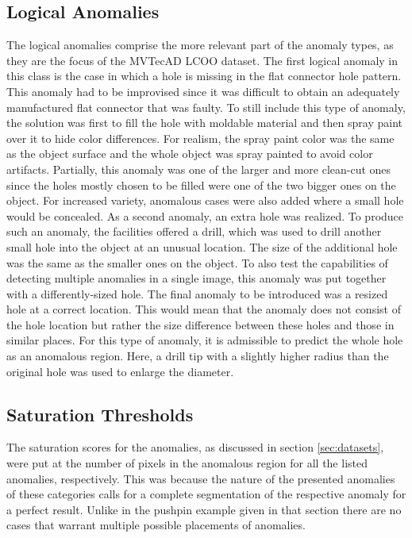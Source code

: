 \subsection{Logical Anomalies}
The logical anomalies comprise the more relevant part of the anomaly types, as they are the focus of the MVTecAD LCOO dataset. The first logical anomaly in this class is the case in which a hole 
is missing in the flat connector hole pattern. This anomaly had to be improvised since it was difficult to obtain an adequately manufactured flat connector that was faulty. To still include 
this type of anomaly, the solution was first to fill the hole with moldable material and then spray paint over it to hide color differences. For realism, the spray paint color was the same as the 
object surface and the whole object was spray painted to avoid color artifacts. Partially, this anomaly was one of the larger and more clean-cut ones since the holes mostly chosen to be filled were one of the two 
bigger ones on the object. For increased variety, anomalous cases were also added where a small hole would be concealed. As a second anomaly, an extra hole was realized. To produce such an anomaly, the facilities offered a drill, which was used to drill another small hole into 
the object at an unusual location. The size of the additional hole was the same as the smaller ones on the object. To also test the capabilities of detecting multiple anomalies in a single image, this anomaly 
was put together with a differently-sized hole. The final anomaly to be introduced was a resized hole at a correct 
location. This would mean that the anomaly does not consist of the hole location but rather the size difference between these holes and those in similar places. For this type of anomaly, it 
is admissible to predict the whole hole as an anomalous region.
Here, a drill tip with a slightly higher radius than the original hole was used to enlarge the diameter.


\subsection{Saturation Thresholds}

The saturation scores for the anomalies, as discussed in section \ref{sec:datasets}, were put at the number of pixels in the anomalous region for all the listed anomalies, 
respectively.
This was because the nature of the presented anomalies of these categories calls for a complete segmentation of the respective anomaly for a perfect result. Unlike in the pushpin example given in that section 
there are no cases that warrant multiple possible placements of anomalies.






